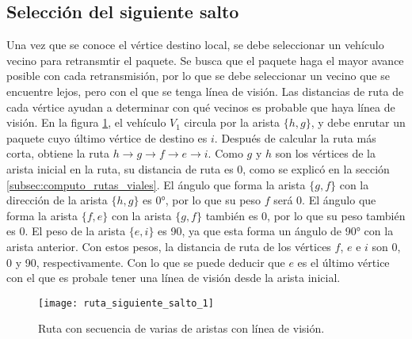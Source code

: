 \subsection{Selección del siguiente salto}

\label{subsec:seleccion_siguiente_salto}

Una vez que se conoce el vértice destino local, se debe seleccionar un vehículo
vecino para retransmtir el paquete. Se busca que el paquete haga el mayor
avance posible con cada retransmisión, por lo que se debe seleccionar un vecino
que se encuentre lejos, pero con el que se tenga línea de visión. Las
distancias de ruta de cada vértice ayudan a determinar con qué vecinos es
probable que haya línea de visión. En la figura
\ref{fig:ruta_siguiente_salto_1}, el vehículo $V_1$ circula por la arista
$\{h,g\}$, y debe enrutar un paquete cuyo último vértice de destino es $i$.
Después de calcular la ruta más corta, obtiene la ruta $h \rightarrow g
\rightarrow f \rightarrow e \rightarrow i$. Como $g$ y $h$ son los vértices de
la arista inicial en la ruta, su distancia de ruta es 0, como se explicó en la
sección \ref{subsec:computo_rutas_viales}. El ángulo que forma la arista
$\{g,f\}$ con la dirección de la arista $\{h,g\}$ es 0\si{\degree}, por lo que su
peso $f$ será 0. El ángulo que forma la arista $\{f,e\}$ con la arista
$\{g,f\}$ también es 0, por lo que su peso también es 0. El peso de la arista
$\{e,i\}$ es 90, ya que esta forma un ángulo de 90\si{\degree} con la arista
anterior. Con estos pesos, la distancia de ruta de los vértices $f$, $e$ e $i$
son 0, 0 y 90, respectivamente. Con lo que se puede deducir que $e$ es el
último vértice con el que es probale tener una línea de visión desde la arista
inicial.

\begin{figure}[th!]
\centering
\texttt{[image: ruta\_siguiente\_salto\_1]}
\decoRule
\caption[Ruta con secuencia de varias aristas con línea de visión]{Ruta con
secuencia de varias de aristas con línea de visión.}
\label{fig:ruta_siguiente_salto_1}
\end{figure}


